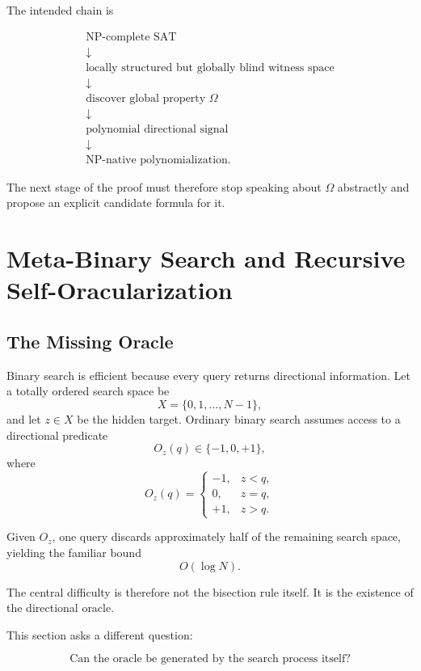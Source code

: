 \documentclass[11pt]{article}
\theoremstyle{plain}
\theoremstyle{definition}
\begin{document}
The intended chain is

\[
\boxed{
\begin{array}{c}
\text{NP-complete SAT}\\[2pt]
\downarrow\\[2pt]
\text{locally structured but globally blind witness space}\\[2pt]
\downarrow\\[2pt]
\text{discover global property }\Omega\\[2pt]
\downarrow\\[2pt]
\text{polynomial directional signal}\\[2pt]
\downarrow\\[2pt]
\text{NP-native polynomialization}.
\end{array}
}
\]

The next stage of the proof must therefore stop speaking about \(\Omega\)
abstractly and propose an explicit candidate formula for it.


\section{Meta-Binary Search and Recursive Self-Oracularization}
\label{sec:meta-binary-search}

\subsection{The Missing Oracle}

Binary search is efficient because every query returns directional
information.  Let a totally ordered search space be
\[
    X=\{0,1,\dots,N-1\},
\]
and let \(z\in X\) be the hidden target.  Ordinary binary search assumes
access to a directional predicate
\[
    O_z(q)\in\{-1,0,+1\},
\]
where
\[
    O_z(q)=
    \begin{cases}
        -1,&z<q,\\
        0,&z=q,\\
        +1,&z>q.
    \end{cases}
\]

Given \(O_z\), one query discards approximately half of the remaining search
space, yielding the familiar bound
\[
    O(\log N).
\]

The central difficulty is therefore not the bisection rule itself.  It is the
existence of the directional oracle.

This section asks a different question:

\[
\boxed{
\text{Can the oracle be generated by the search process itself?}
}
\]
\end{document}
